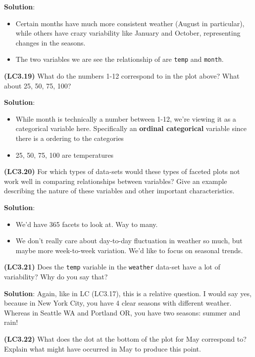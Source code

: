 \documentclass[12pt,]{krantz}
\providecommand{\tightlist}{%
  \setlength{\itemsep}{0pt}\setlength{\parskip}{0pt}}
\begin{document}
\textbf{Solution}:

\begin{itemize}
\tightlist
\item
  Certain months have much more consistent weather (August in
  particular), while others have crazy variability like January and
  October, representing changes in the seasons.
\item
  The two variables we are see the relationship of are \texttt{temp} and
  \texttt{month}.
\end{itemize}

\textbf{(LC3.19)} What do the numbers 1-12 correspond to in the plot
above? What about 25, 50, 75, 100?

\textbf{Solution}:

\begin{itemize}
\tightlist
\item
  While month is technically a number between 1-12, we're viewing it as
  a categorical variable here. Specifically an \textbf{ordinal
  categorical} variable since there is a ordering to the categories
\item
  25, 50, 75, 100 are temperatures
\end{itemize}

\textbf{(LC3.20)} For which types of data-sets would these types of
faceted plots not work well in comparing relationships between
variables? Give an example describing the nature of these variables and
other important characteristics.

\textbf{Solution}:

\begin{itemize}
\tightlist
\item
  We'd have 365 facets to look at. Way to many.
\item
  We don't really care about day-to-day fluctuation in weather so much,
  but maybe more week-to-week variation. We'd like to focus on seasonal
  trends.
\end{itemize}

\textbf{(LC3.21)} Does the \texttt{temp} variable in the
\texttt{weather} data-set have a lot of variability? Why do you say
that?

\textbf{Solution}: Again, like in LC (LC3.17), this is a relative
question. I would say yes, because in New York City, you have 4 clear
seasons with different weather. Whereas in Seattle WA and Portland OR,
you have two seasons: summer and rain!

\textbf{(LC3.22)} What does the dot at the bottom of the plot for May
correspond to? Explain what might have occurred in May to produce this
point.
\end{document}

